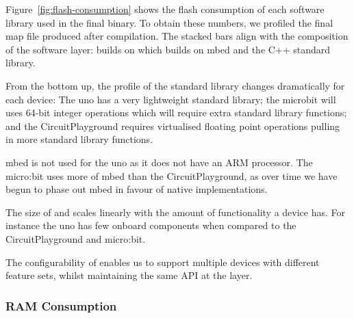 Figure~\ref{fig:flash-consumption} shows the flash consumption of each software library used in the final \MC binary. To obtain these numbers, we profiled the final map file produced after compilation. The stacked bars align with the composition of the software layer: \MC builds on \CO which builds on mbed and the C++ standard library.

From the bottom up, the profile of the standard library changes dramatically for each device: The uno has a very lightweight standard library; the microbit will uses 64-bit integer operations which will require extra standard library functions; and the CircuitPlayground requires virtualised floating point operations pulling in more standard library functions.

mbed is not used for the uno as it does not have an ARM processor. The micro:bit uses more of mbed than the CircuitPlayground, as over time we have begun to phase out mbed in favour of native implementations.

The size of \CO and \MC scales linearly with the amount of functionality a device has. For instance the uno has few onboard components when compared to the CircuitPlayground and micro:bit.

The configurability of \CO enables us to support multiple devices with different feature sets, whilst maintaining the same API at the \MC layer.

\subsubsection{RAM Consumption}



